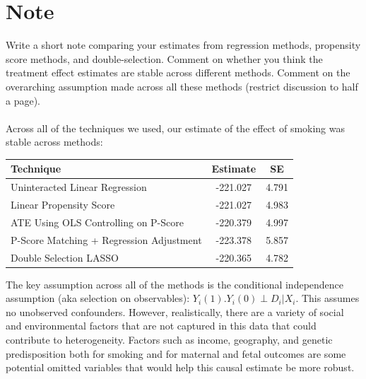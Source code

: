 \documentclass{article}
\begin{document}
\section{Note}
Write a short note comparing your estimates from regression methods, propensity score methods, and double-selection. Comment on whether you think the treatment effect estimates are stable across different methods. Comment on the overarching assumption made across all these methods (restrict discussion to half a page). \\\\

\noindent Across all of the techniques we used, our estimate of the effect of smoking was stable across methods:
\begin{table}[h]
    \centering
    \begin{tabular}{l c c }
         \hline
         \textbf{Technique} & \textbf{Estimate} & \textbf{SE}\\
         \hline
         Uninteracted Linear Regression & -221.027 & 4.791\\
         \hline
         Linear Propensity Score & -221.027 & 4.983 \\
         \hline
         ATE Using OLS Controlling on P-Score & -220.379 & 4.997 \\
         \hline
         P-Score Matching + Regression Adjustment & -223.378 & 5.857 \\
         \hline
         Double Selection LASSO & -220.365 & 4.782 \\
         \hline   
    \end{tabular}
\end{table}

\noindent The key assumption across all of the methods is the conditional independence assumption (aka selection on observables): $Y_i(1). Y_i(0) \perp D_i | X_i$. This assumes no unobserved confounders. However, realistically, there are a variety of social and environmental factors that are not captured in this data that could contribute to heterogeneity. Factors such as income, geography, and genetic predisposition both for smoking and for maternal and fetal outcomes are some potential omitted variables that would help this causal estimate be more robust.
\end{document}
